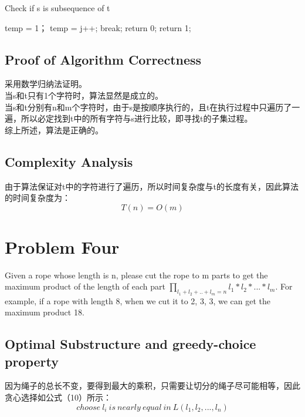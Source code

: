 \documentclass{article}
\begin{document}
\begin{CJK*}{UTF8}{gbsn}
\begin{algorithm}[htbp]  
  \caption{Check if s is subsequence of t}  
  \begin{algorithmic}[1] 
	\State temp = 1；
	\State temp = j++;
	\State break;
	\EndIf
	\State return 0;
	\EndFor
	\EndFor
	\State return 1;
    \EndFunction 
  \end{algorithmic}  
\end{algorithm} 

\subsection{Proof of Algorithm Correctness}
采用数学归纳法证明。\\

当s和t只有1个字符时，算法显然是成立的。\\

当s和t分别有n和m个字符时，由于s是按顺序执行的，且t在执行过程中只遍历了一遍，所以必定找到t中的所有字符与s进行比较，即寻找t的子集过程。\\

综上所述，算法是正确的。


\subsection{Complexity Analysis}
由于算法保证对t中的字符进行了遍历，所以时间复杂度与t的长度有关，因此算法的时间复杂度为：
\begin{equation}
T(n)= O(m)
\end{equation} 


\newpage
\section{Problem Four}
Given a rope whose length is n, please cut the rope to m parts to get the maximum product of the length of each part $\prod_{l_1+l_2+..+l_m=n} l_1 \ast l_2 \ast ... \ast l_m$. For example, if a rope with length 8, when we cut it to 2, 3, 3, we can get the maximum product 18.


\subsection{Optimal Substructure and greedy-choice property}
因为绳子的总长不变，要得到最大的乘积，只需要让切分的绳子尽可能相等，因此贪心选择如公式（10）所示：
\begin{equation}
choose\ l_i\ is\ nearly\ equal\ in\ L(l_1,l_2,...,l_n)
\end{equation} 


\end{CJK*}
\end{document}
